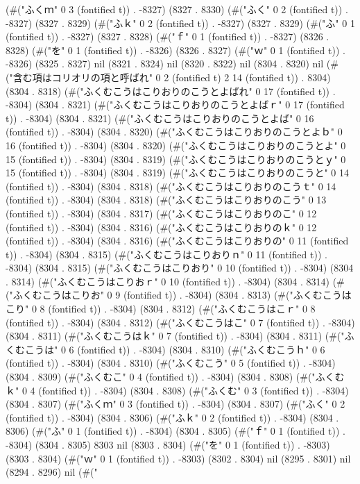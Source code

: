 (#("ふくｍ" 0 3 (fontified t)) . -8327) (8327 . 8330) (#("ふく" 0 2 (fontified t)) . -8327) (8327 . 8329) (#("ふｋ" 0 2 (fontified t)) . -8327) (8327 . 8329) (#("ふ" 0 1 (fontified t)) . -8327) (8327 . 8328) (#("ｆ" 0 1 (fontified t)) . -8327) (8326 . 8328) (#("を" 0 1 (fontified t)) . -8326) (8326 . 8327) (#("ｗ" 0 1 (fontified t)) . -8326) (8325 . 8327) nil (8321 . 8324) nil (8320 . 8322) nil (8304 . 8320) nil (#("含む項はコリオリの項と呼ばれ" 0 2 (fontified t) 2 14 (fontified t)) . 8304) (8304 . 8318) (#("ふくむこうはこりおりのこうとよばれ" 0 17 (fontified t)) . -8304) (8304 . 8321) (#("ふくむこうはこりおりのこうとよばｒ" 0 17 (fontified t)) . -8304) (8304 . 8321) (#("ふくむこうはこりおりのこうとよば" 0 16 (fontified t)) . -8304) (8304 . 8320) (#("ふくむこうはこりおりのこうとよｂ" 0 16 (fontified t)) . -8304) (8304 . 8320) (#("ふくむこうはこりおりのこうとよ" 0 15 (fontified t)) . -8304) (8304 . 8319) (#("ふくむこうはこりおりのこうとｙ" 0 15 (fontified t)) . -8304) (8304 . 8319) (#("ふくむこうはこりおりのこうと" 0 14 (fontified t)) . -8304) (8304 . 8318) (#("ふくむこうはこりおりのこうｔ" 0 14 (fontified t)) . -8304) (8304 . 8318) (#("ふくむこうはこりおりのこう" 0 13 (fontified t)) . -8304) (8304 . 8317) (#("ふくむこうはこりおりのこ" 0 12 (fontified t)) . -8304) (8304 . 8316) (#("ふくむこうはこりおりのｋ" 0 12 (fontified t)) . -8304) (8304 . 8316) (#("ふくむこうはこりおりの" 0 11 (fontified t)) . -8304) (8304 . 8315) (#("ふくむこうはこりおりｎ" 0 11 (fontified t)) . -8304) (8304 . 8315) (#("ふくむこうはこりおり" 0 10 (fontified t)) . -8304) (8304 . 8314) (#("ふくむこうはこりおｒ" 0 10 (fontified t)) . -8304) (8304 . 8314) (#("ふくむこうはこりお" 0 9 (fontified t)) . -8304) (8304 . 8313) (#("ふくむこうはこり" 0 8 (fontified t)) . -8304) (8304 . 8312) (#("ふくむこうはこｒ" 0 8 (fontified t)) . -8304) (8304 . 8312) (#("ふくむこうはこ" 0 7 (fontified t)) . -8304) (8304 . 8311) (#("ふくむこうはｋ" 0 7 (fontified t)) . -8304) (8304 . 8311) (#("ふくむこうは" 0 6 (fontified t)) . -8304) (8304 . 8310) (#("ふくむこうｈ" 0 6 (fontified t)) . -8304) (8304 . 8310) (#("ふくむこう" 0 5 (fontified t)) . -8304) (8304 . 8309) (#("ふくむこ" 0 4 (fontified t)) . -8304) (8304 . 8308) (#("ふくむｋ" 0 4 (fontified t)) . -8304) (8304 . 8308) (#("ふくむ" 0 3 (fontified t)) . -8304) (8304 . 8307) (#("ふくｍ" 0 3 (fontified t)) . -8304) (8304 . 8307) (#("ふく" 0 2 (fontified t)) . -8304) (8304 . 8306) (#("ふｋ" 0 2 (fontified t)) . -8304) (8304 . 8306) (#("ふ" 0 1 (fontified t)) . -8304) (8304 . 8305) (#("ｆ" 0 1 (fontified t)) . -8304) (8304 . 8305) 8303 nil (8303 . 8304) (#("を" 0 1 (fontified t)) . -8303) (8303 . 8304) (#("ｗ" 0 1 (fontified t)) . -8303) (8302 . 8304) nil (8295 . 8301) nil (8294 . 8296) nil (#("
